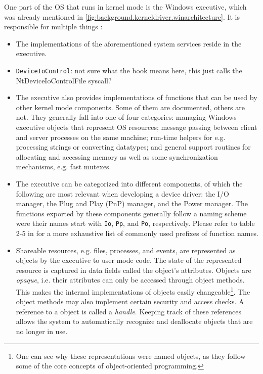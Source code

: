 One part of the OS that runs in kernel mode is the Windows executive, which was already mentioned in \autoref{fig:background.kerneldriver.winarchitecture}. It is responsible for multiple things \cite{Yosifovich2017}:
\begin{itemize}
	\item The implementations of the aforementioned system services reside in the executive.
	\item \texttt{DeviceIoControl}: not sure what the book means here, this just calls the NtDeviceIoControlFile syscall? \\
	\item The executive also provides implementations of functions that can be used by other kernel mode components. Some of them are documented, others are not. They generally fall into one of four categories: managing Windows executive objects that represent OS resources; message passing between client and server processes on the same machine; run-time helpers for e.g. processing strings or converting datatypes; and general support routines for allocating and accessing memory as well as some synchronization mechanisms, e.g. fast mutexes.
	\item The executive can be categorized into different components, of which the following are most relevant when developing a device driver: the I/O manager, the Plug and Play (PnP) manager, and the Power manager. The functions exported by these components generally follow a naming scheme were their names start with \texttt{Io}, \texttt{Pp}, and \texttt{Po}, respectively. Please refer to table 2-5 in \cite{Yosifovich2017} for a more exhaustive list of commonly used prefixes of function names.
	\item Shareable resources, e.g. files, processes, and events, are represented as objects by the executive to user mode code. The state of the represented resource is captured in data fields called the object's attributes. Objects are \emph{opaque}, i.e. their attributes can only be accessed through object methods. This makes the internal implementations of objects easily changeable\footnote{\label{background.kerneldriver.oop} One can see why these representations were named objects, as they follow some of the core concepts of object-oriented programming.}. The object methods may also implement certain security and access checks. A reference to a object is called a \emph{handle}. Keeping track of these references allows the system to automatically recognize and deallocate objects that are no longer in use.
\end{itemize}

